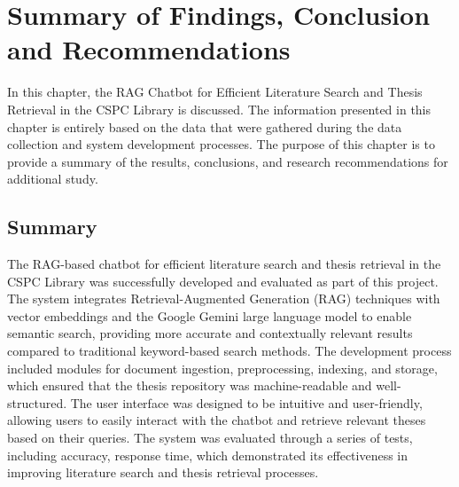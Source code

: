 
\chapter{Summary of Findings, Conclusion and Recommendations}
\begin{refsection}
In this chapter, the RAG Chatbot for Efficient Literature Search and Thesis Retrieval in the CSPC Library is discussed. The information presented in this chapter is entirely based on the data that were gathered during the data collection and system development processes. The purpose of this chapter is to provide a summary of the results, conclusions, and research recommendations for additional study.

\section{Summary}
The RAG-based chatbot for efficient literature search and thesis retrieval in the CSPC Library was successfully developed and evaluated as part of this project. The system integrates Retrieval-Augmented Generation (RAG) techniques with vector embeddings and the Google Gemini large language model to enable semantic search, providing more accurate and contextually relevant results compared to traditional keyword-based search methods. The development process included modules for document ingestion, preprocessing, indexing, and storage, which ensured that the thesis repository was machine-readable and well-structured. The user interface was designed to be intuitive and user-friendly, allowing users to easily interact with the chatbot and retrieve relevant theses based on their queries. The system was evaluated through a series of tests, including accuracy, response time, which demonstrated its effectiveness in improving literature search and thesis retrieval processes.


\end{refsection}
